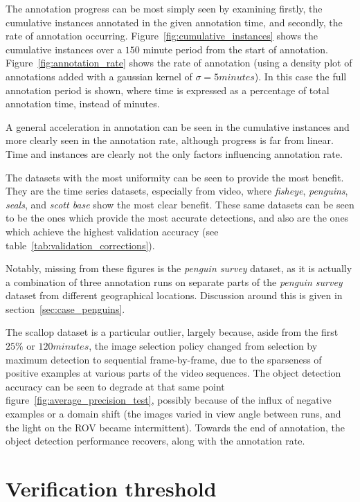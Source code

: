 The annotation progress can be most simply seen by examining firstly, the cumulative instances annotated in the given annotation time, and secondly, the rate of annotation occurring. Figure~\ref{fig:cumulative_instances} shows the cumulative instances over a $150$ minute period from the start of annotation. Figure~\ref{fig:annotation_rate} shows the rate of annotation (using a density plot of annotations added with a gaussian kernel of $\sigma = 5 minutes$). In this case the full annotation period is shown, where time is expressed as a percentage of total annotation time, instead of minutes.

A general acceleration in annotation can be seen in the  cumulative instances and more clearly seen in the annotation rate, although progress is far from linear. Time and instances are clearly not the only factors influencing annotation rate. 

The datasets with the most uniformity can be seen to provide the most benefit. They are the time series datasets, especially from video, where \emph{fisheye}, \emph{penguins}, \emph{seals}, and \emph{scott base} show the most clear benefit. These same datasets can be seen to be the ones which provide the most accurate detections, and also are the ones which achieve the highest validation accuracy (see table~\ref{tab:validation_corrections}).

Notably, missing from these figures is the \emph{penguin survey} dataset, as it is actually a combination of three annotation runs on separate parts of the \emph{penguin survey} dataset from different geographical locations. Discussion around this is given in section~\ref{sec:case_penguins}.


The scallop dataset is a particular outlier, largely because, aside from the first $25\%$ or $120 minutes$, the image selection policy changed from selection by maximum detection to sequential frame-by-frame, due to the sparseness of positive examples at various parts of the video sequences. The object detection accuracy can be seen to degrade at that same point figure~\ref{fig:average_precision_test}, possibly because of the influx of negative examples or a domain shift (the images varied in view angle between runs, and the light on the \gls{ROV} became intermittent). Towards the end of annotation, the object detection performance recovers, along with the annotation rate. 


\section{Verification threshold}
\label{sec:verification_threshold}

